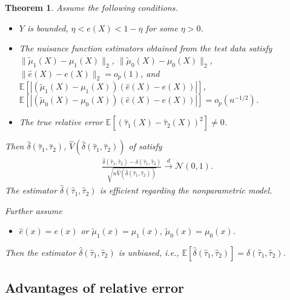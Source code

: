 \documentclass[twoside]{article}
\newtheorem{theorem}{Theorem}
\newcommand{\calN}{\mathcal{N}}
\newcommand{\1}{{\mathbbm{1}}}
\def\EE{\mathbb{E}}
\begin{document}
\begin{theorem}\label{theo:relative.error}
    Assume the following conditions.
    \begin{itemize}
        \item [(a)] $Y$ is bounded, $\eta< e(X) < 1 - \eta$ for some $\eta > 0$.
        \item [(b)] The nuisance function estimators obtained from the test data satisfy $\|\tilde{\mu}_{1}(X) - \mu_1(X)\|_2$, $\|\tilde{\mu}_{0}(X) - \mu_0(X)\|_2$, $\|\hat{e}(X) - e(X)\|_2 = o_p(1)$, and $\EE[|(\tilde{\mu}_{1}(X) - \mu_1(X))(\hat{e}(X) - e(X))|]$, $\EE[|(\tilde{\mu}_{0}(X) - \mu_0(X))(\hat{e}(X) - e(X))|] = o_p(n^{-1/2})$.
        \item [(c)] The true relative error $\EE[(\hat{\tau}_1(X) - \hat{\tau}_2(X))^2] \neq 0$.
    \end{itemize}
    Then $\hat{\delta}(\hat{\tau}_1, \hat{\tau}_2)$, $\hat{V}(\hat{\delta}(\hat{\tau}_1, \hat{\tau}_2))$ of  satisfy
    \begin{align*}
        \frac{ \hat{\delta}(\hat{\tau}_1, \hat{\tau}_2) -     {\delta}(\hat{\tau}_1, \hat{\tau}_2)}{\sqrt{n\hat{V}(    \hat{\delta}(\hat{\tau}_1, \hat{\tau}_2))}}
        \stackrel{d}{\to} \calN(0,1).
    \end{align*}
    The estimator $\hat{\delta}(\hat{\tau}_1, \hat{\tau}_2)$ is efficient regarding the nonparametric model.

    Further assume
      \begin{itemize}
        \item [(d)] $\hat{e}(x) = e(x)$ or $\tilde{\mu}_{1}(x) = \mu_1(x)$, $\tilde{\mu}_{0}(x) = \mu_0(x)$.
    \end{itemize}
    Then the estimator $\hat{\delta}(\hat{\tau}_1, \hat{\tau}_2)$ is unbiased, i.e., $\EE\left[\hat{\delta}(\hat{\tau}_1, \hat{\tau}_2)\right]
        = {\delta}(\hat{\tau}_1, \hat{\tau}_2)$.
\end{theorem}



\subsection{Advantages of relative error}\label{sec:relative.error.advantage}

\end{document}
